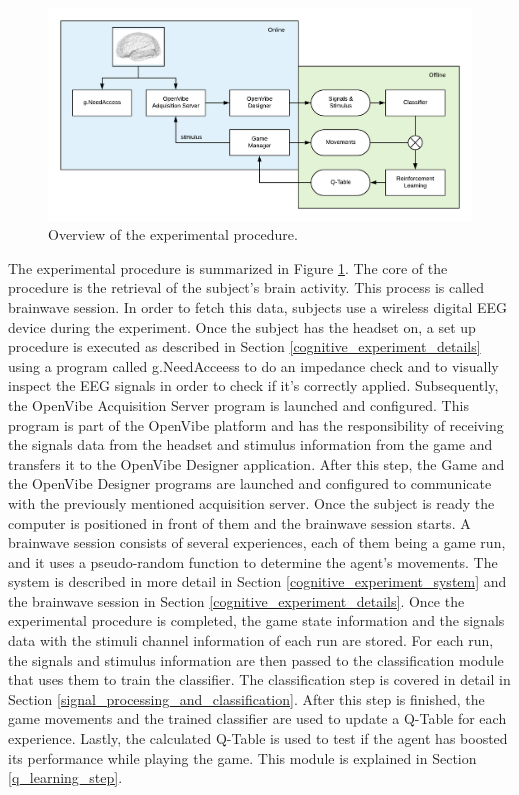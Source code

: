 \documentclass[journal]{IEEEtran}
\begin{document}
\begin{figure}[h]
    \centering
    \includegraphics[scale=0.4]{Images/complete_flow.png}
    \caption{Overview of the experimental procedure.}
    \label{diag:complete_flow}
\end{figure}

The experimental procedure is summarized in Figure \ref{diag:complete_flow}. The core of the procedure is the retrieval of the subject's brain activity. This process is called brainwave session. In order to fetch this data, subjects use a wireless digital EEG device during the experiment. Once the subject has the headset on, a set up procedure is executed as described in Section \ref{cognitive_experiment_details} using a program called g.NeedAcceess to do an impedance check and to visually inspect the EEG signals in order to check if it's correctly applied. Subsequently, the OpenVibe Acquisition Server program is launched and configured. This program is part of the OpenVibe platform \cite{OPEN-VIBE-PAPER} and has the responsibility of receiving the signals data from the headset and stimulus information from the game and transfers it to the OpenVibe Designer application. After this step, the Game and the OpenVibe Designer programs are launched and configured to communicate with the previously mentioned acquisition server. Once the subject is ready the computer is positioned in front of them and the brainwave session starts. A brainwave session consists of several experiences, each of them being a game run, and it uses a pseudo-random function to determine the agent's movements. The system is described in more detail in Section \ref{cognitive_experiment_system} and the brainwave session in Section \ref{cognitive_experiment_details}. Once the experimental procedure is completed, the game state information and the signals data with the stimuli channel information of each run are stored. For each run, the signals and stimulus information are then passed to the classification module that uses them to train the classifier. The classification step is covered in detail in Section \ref{signal_processing_and_classification}. After this step is finished, the game movements and the trained classifier are used to update a Q-Table for each experience. Lastly, the calculated Q-Table is used to test if the agent has boosted its performance while playing the game. This module is explained in Section \ref{q_learning_step}.
\end{document}
